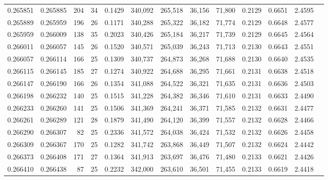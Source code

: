 \begin{tabular}{rrrrrrrrrrrrr}
0.265851 & 0.265885 &   204 &  34 &                                     0.1429 & 340,092 & 265,518 &  36,156 &  71,800 & 0.2129 & 0.6651 & 2.4595 \\
0.265889 & 0.265959 &   196 &  26 &                                     0.1171 & 340,288 & 265,322 &  36,182 &  71,774 & 0.2129 & 0.6648 & 2.4577 \\
0.265959 & 0.266009 &   138 &  35 &                                     0.2023 & 340,426 & 265,184 &  36,217 &  71,739 & 0.2129 & 0.6645 & 2.4564 \\
0.266011 & 0.266057 &   145 &  26 &                                     0.1520 & 340,571 & 265,039 &  36,243 &  71,713 & 0.2130 & 0.6643 & 2.4551 \\
0.266057 & 0.266114 &   166 &  25 &                                     0.1309 & 340,737 & 264,873 &  36,268 &  71,688 & 0.2130 & 0.6640 & 2.4535 \\
0.266115 & 0.266145 &   185 &  27 &                                     0.1274 & 340,922 & 264,688 &  36,295 &  71,661 & 0.2131 & 0.6638 & 2.4518 \\
0.266147 & 0.266190 &   166 &  26 &                                     0.1354 & 341,088 & 264,522 &  36,321 &  71,635 & 0.2131 & 0.6636 & 2.4503 \\
0.266198 & 0.266232 &   140 &  25 &                                     0.1515 & 341,228 & 264,382 &  36,346 &  71,610 & 0.2131 & 0.6633 & 2.4490 \\
0.266233 & 0.266260 &   141 &  25 &                                     0.1506 & 341,369 & 264,241 &  36,371 &  71,585 & 0.2132 & 0.6631 & 2.4477 \\
0.266261 & 0.266289 &   121 &  28 &                                     0.1879 & 341,490 & 264,120 &  36,399 &  71,557 & 0.2132 & 0.6628 & 2.4466 \\
0.266290 & 0.266307 &    82 &  25 &                                     0.2336 & 341,572 & 264,038 &  36,424 &  71,532 & 0.2132 & 0.6626 & 2.4458 \\
0.266309 & 0.266367 &   170 &  25 &                                     0.1282 & 341,742 & 263,868 &  36,449 &  71,507 & 0.2132 & 0.6624 & 2.4442 \\
0.266373 & 0.266408 &   171 &  27 &                                     0.1364 & 341,913 & 263,697 &  36,476 &  71,480 & 0.2133 & 0.6621 & 2.4426 \\
0.266410 & 0.266438 &    87 &  25 &                                     0.2232 & 342,000 & 263,610 &  36,501 &  71,455 & 0.2133 & 0.6619 & 2.4418 \\

\end{tabular}
